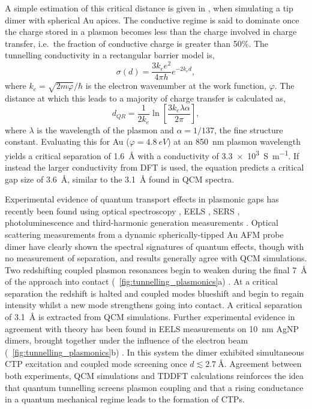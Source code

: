 \documentclass{article}
\begin{document}
A simple estimation of this critical distance is given in \cite{savage2012}, when simulating a tip dimer with spherical Au apices. The conductive regime is said to dominate once the charge stored in a plasmon becomes less than the charge involved in charge transfer, i.e.\ the fraction of conductive charge is greater than 50\%. The tunnelling conductivity in a rectangular barrier model is,
\begin{equation}
	\sigma(d) = \frac{3k_ee^2}{4\pi h} e^{-2k_e d},
\end{equation}
where $k_e=\sqrt{2m\varphi}/\hbar$ is the electron wavenumber at the work function, $\varphi$. The distance at which this leads to a majority of charge transfer is calculated as,
\begin{equation}
	d_{QR} = \frac{1}{2k_e}\ln\left[ \frac{3k_e\lambda\alpha}{2\pi} \right],
\end{equation}
where $\lambda$ is the wavelength of the plasmon and $\alpha=1/137$, the fine structure constant. Evaluating this for Au ($\varphi=\SI{4.8}{eV}$) at an \SI{850}{nm} plasmon wavelength yields a critical separation of \SI{1.6}{\angstrom} with a conductivity of \SI{3.3e3}{S.m^{-1}}. If instead the larger conductivity from DFT is used, the equation predicts a critical gap size of \SI{3.6}{\angstrom}, similar to the \SI{3.1}{\angstrom} found in QCM spectra.

Experimental evidence of quantum transport effects in plasmonic gaps has recently been found using optical spectroscopy \cite{savage2012, cha2014, zhu2014}, EELS \cite{scholl2013}, SERS \cite{zhu2014}, photoluminescence \cite{kravtsov2014} and third-harmonic generation measurements \cite{hajisalem2014}.
Optical scattering measurements from a dynamic spherically-tipped Au AFM probe dimer have clearly shown the spectral signatures of quantum effects, though with no measurement of separation, and results generally agree with QCM simulations. Two redshifting coupled plasmon resonances begin to weaken during the final \SI{7}{\angstrom} of the approach into contact (\figurename~\ref{fig:tunnelling_plasmonics}a) \cite{savage2012}. At a critical separation the redshift is halted and coupled modes blueshift and begin to regain intensity whilst a new mode strengthens going into contact. A critical separation of \SI{3.1}{\angstrom} is extracted from QCM simulations.
Further experimental evidence in agreement with theory has been found in EELS measurements on \SI{10}{nm} AgNP dimers, brought together under the influence of the electron beam (\figurename~\ref{fig:tunnelling_plasmonics}b) \cite{scholl2013}. In this system the dimer exhibited simultaneous CTP excitation and coupled mode screening once $d\lesssim\SI{2.7}{\angstrom}$.
Agreement between both experiments, QCM simulations and TDDFT calculations reinforces the idea that quantum tunnelling screens plasmon coupling and that a rising conductance in a quantum mechanical regime leads to the formation of CTPs.
\end{document}
